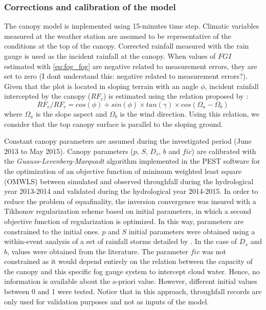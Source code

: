 \documentclass[a4paper,12pt]{article}
\begin{document}
\begin{linenumbers}
\subsubsection{Corrections and calibration of the model}
The canopy model is implemented using 15-minutes time step. Climatic variables measured at the weather station are assumed to be representative of the conditions at the top of the canopy. Corrected rainfall measured with the rain gauge is used as the incident rainfall at the canopy. When values of $FGI$ estimated with \autoref{eq:fog_fog} are negative related to measurement errors, they are set to zero (I dont understand this: negative related to measurement errors?). Given that the plot is located in sloping terrain with an angle $\phi$, incident rainfall intercepted by the canopy ($RF_c$) is estimated using the relation proposed by \cite{Sharon1980}:
\begin{equation} \label{eq:fog_coef}
RF_v/RF_c = cos(\phi) + sin(\phi) \times tan(\gamma) \times cos(\Omega_a - \Omega_b) 
\end{equation}
where $\Omega_a$ is the slope aspect and $ \Omega_b$ is the wind direction. Using this relation, we consider that the top canopy surface is parallel to the sloping ground. 
  
Constant canopy parameters are assumed during the investigated period (June 2013 to May 2015). Canopy parameters ($p$, $S$, $D_s$, $b$ and $fic$) are calibrated with the \emph{Guauss-Levenberg-Marquadt} algorithm implemented in the PEST software \citep{PestDoherty2010} for the optimization of an objective function of minimum weighted least square (OMWLS) between simulated and observed throughfall during the hydrological year 2013-2014 and validated during the hydrological year 2014-2015. In order to reduce the problem of equafinality, the inversion convergence was insured with a Tikhonov regularization scheme based on initial parameters, in which a second objective function of regularization is optimized. In this way, parameters are constrained to the initial ones. $p$ and $S$ initial parameters were obtained using a within-event analysis of a set of rainfall storms detailed by \cite{Linketal2004}. In the case of $D_s$ and $b$, values were obtained from the literature. The parameter $fic$ was not constrained as it would depend entirely on the relation between the capacity of the canopy and this specific fog gauge system to intercept cloud water. Hence, no information is available about the a-priori value. However, different initial values between 0 and 1 were tested. Notice that in this approach, throughfall records are only used for validation purposes and not as inputs of the model.


\end{linenumbers}
\end{document}
